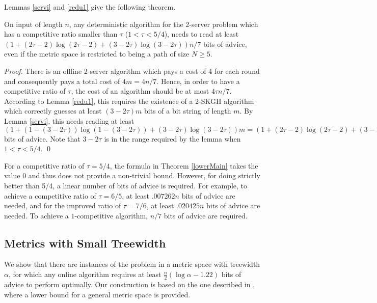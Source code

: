 Lemmas \ref{servi} and \ref{redu1} give the following theorem.

\begin{theorem} \label{lowerMain}
On input of length $n$, any deterministic algorithm for the $2$-server problem which has a competitive ratio smaller than $\tau$ ($1< \tau < 5/4$), needs to read at least $(1+(2\tau-2) \log (2\tau-2) + (3-2\tau)\log(3-2\tau)) n/7$ bits of advice, even if the metric space is restricted to being a path of size $N \geq 5$. 
\end{theorem}

\begin{proof}
There is an offline 2-server algorithm which pays a cost of 4 for each round and consequently pays a total cost of $4m = 4n/7$. Hence, in order to have a competitive ratio of $\tau$, the cost of an algorithm should be at most $4\tau n /7$. According to Lemma \ref{redu1}, this requires the existence of a 2-SKGH algorithm which correctly guesses at least $(3-2\tau)m$ bits of a bit string of length $m$. By Lemma \ref{servi}, this needs reading at least $(1 + (1 - (3-2\tau)) \log(1 - (3-2\tau)) + (3-2\tau) \log (3-2\tau)) m = (1+(2\tau-2) \log (2\tau-2) + (3-2\tau)\log(3-2\tau)) n/7$ bits of advice. Note that $3-2\tau$ is in the range required by the lemma when $1< \tau < 5/4$. \qed
\end{proof}


For a competitive ratio of $\tau = 5/4$, the formula in Theorem \ref{lowerMain} takes the value 0 and thus does not provide a non-trivial bound. However, for doing strictly better than 5/4, a linear number of bits of advice is required. For example, to achieve a competitive ratio of $\tau = 6/5$, at least $.007262 n$ bits of advice are needed, and for the improved ratio of $\tau= 7/6$, at least $.020425 n$ bits of advice are needed. To achieve a $1$-competitive algorithm, $n/7$ bits of advice are required.

\subsection{Metrics with Small Treewidth}
We show that there are instances of the \ks problem in a metric space with treewidth $\alpha$, for which any online algorithm requires at least $\frac{n}{2}(\log \alpha- 1.22)$ bits of advice to perform optimally. Our construction is based on the one described in \cite{Bock11}, where a lower bound for a general metric space is provided. 


